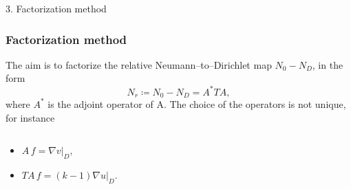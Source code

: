 \documentclass[10pt]{beamer}
\theoremstyle{plain}
\theoremstyle{plain}
\begin{document}
\begin{frame}[noframenumbering]
 \begin{center}
 \Large
 3. Factorization method 
 \end{center}
\end{frame}
\begin{frame}
 \frametitle{Factorization method}
 The aim is to factorize the relative Neumann--to--Dirichlet map ${N_0} - {N_D}$, in the form
\begin{equation}
 {N_r}\coloneqq{N_0} - {N_D} = A^*TA,
\end{equation}
where
$A^*$ is the adjoint operator of A. 
The choice of the operators is not unique, for instance
\begin{columns}[T]
\begin{column}{0.5\textwidth}
\vspace{0.8cm}
\begin{itemize}
 \item 
 $A\,f = \nabla v|_D,$
 \item 
 $TA\,f = 
 (k-1) \nabla u|_D.$
\end{itemize}\end{column}
\begin{column}{0.5\textwidth}
\end{column}
\end{columns}

\end{frame}
\end{document}
